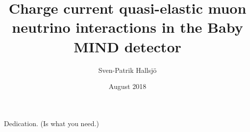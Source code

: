 \documentclass[twoside,hidelinks]{glasgowthesis}
\begin{document}
\pagestyle{empty}

\title{Charge current quasi-elastic muon neutrino interactions in the Baby MIND detector}
\author{Sven-Patrik Hallsj{\"o}}
\date{August 2018}

\maketitle

\cleardoublepage

 

\cleardoublepage
\vspace*{1.75in}
\begin{flushright} Dedication. (Is what you need.)\end{flushright}

\newpage
 

\newpage
 










\tableofcontents
\listoftables
\listoffigures

\cleardoublepage
\pagestyle{fancy}
\setcounter{page}{1}
\end{document}
